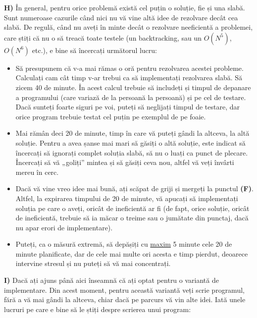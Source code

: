 {\bf H)} În general, pentru orice problemă există cel puțin o soluție, fie și
una slabă. Sunt numeroase cazurile când nici nu vă vine altă idee de rezolvare
decât cea slabă. De regulă, când nu aveți în minte decât o rezolvare
neeficientă a problemei, care știți că nu o să treacă toate testele (un
backtracking, sau un $O(N^5)$, $O(N^6)$ etc.), e bine să încercați următorul
lucru:

\begin{itemize}

\item Să presupunem că v-a mai rămas o oră pentru rezolvarea acestei
  probleme. Calculați cam cât timp v-ar trebui ca să implementați rezolvarea
  slabă. Să zicem 40 de minute. În acest calcul trebuie să includeți și timpul
  de depanare a programului (care variază de la persoană la persoană) și pe
  cel de testare. Dacă sunteți foarte siguri pe voi, puteți să neglijați
  timpul de testare, dar orice program trebuie testat cel puțin pe exemplul de
  pe foaie.
  
\item Mai rămân deci 20 de minute, timp în care vă puteți gândi la altceva, la
  altă soluție. Pentru a avea șanse mai mari să găsiți o altă soluție, este
  indicat să încercați să ignorați complet soluția slabă, să nu o luați ca
  punct de plecare. Încercați să vă „goliți” mintea și să găsiți ceva nou,
  altfel vă veți învârti mereu în cerc.
  
\item Dacă vă vine vreo idee mai bună, ați scăpat de griji și mergeți la
  punctul {\bf (F)}. Altfel, la expirarea timpului de 20 de minute, vă apucați
  să implementați soluția pe care o aveți, oricât de ineficientă ar fi (de
  fapt, orice soluție, oricât de ineficientă, trebuie să ia măcar o treime sau
  o jumătate din punctaj, dacă nu apar erori de implementare).
  
\item Puteți, ca o măsură extremă, să depășiți cu \underline{maxim} 5 minute
  cele 20 de minute planificate, dar de cele mai multe ori acesta e timp
  pierdut, deoarece intervine stresul și nu puteți să vă mai concentrați.

\end{itemize}

{\bf I)} Dacă ați ajuns până aici înseamnă că ați optat pentru o variantă de
implementare. Din acest moment, pentru această variantă veți scrie programul,
fără a vă mai gândi la altceva, chiar dacă pe parcurs vă vin alte idei. Iată
unele lucruri pe care e bine să le știți despre scrierea unui program:

